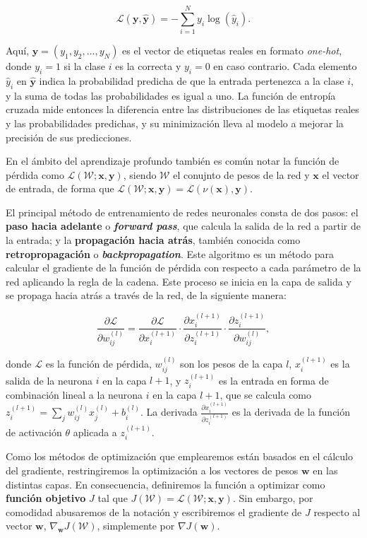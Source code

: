 \[
\mathcal{L}(\mathbf{y}, \mathbf{\hat{y}}) = -\sum_{i=1}^{N}y_{i} \log(\hat{y}_{i}
).
\]

Aquí, $\mathbf{y}= (y_{1}, y_{2}, \ldots, y_{N})$ es el vector de etiquetas
reales en formato \textit{one-hot}, donde $y_{i} = 1$ si la clase $i$ es la
correcta y $y_{i} = 0$ en caso contrario. Cada elemento $\hat{y}_{i}$ en $\mathbf{\hat{y}}$
indica la probabilidad predicha de que la entrada pertenezca a la clase $i$, y
la suma de todas las probabilidades es igual a uno. La función de entropía cruzada
mide entonces la diferencia entre las distribuciones de las etiquetas reales y las
probabilidades predichas, y su minimización lleva al modelo a mejorar la
precisión de sus predicciones.

En el ámbito del aprendizaje profundo también es común notar la función de
pérdida como $\mathcal{L}(\mathcal{W};\mathbf{x}, \mathbf{y})$, siendo $\mathcal{W}$
el conujnto de pesos de la red y $\mathbf{x}$ el vector de entrada, de forma que
$\mathcal{L}(\mathcal{W};\mathbf{x}, \mathbf{y}) = \mathcal{L}(\nu(\mathbf{x}), \mathbf{y}
)$.

El principal método de entrenamiento de redes neuronales consta de dos pasos: el
\textbf{paso hacia adelante} o \textbf{\textit{forward pass}}, que calcula la
salida de la red a partir de la entrada; y la \textbf{propagación hacia atrás}, también
conocida como \textbf{retropropagación} o \textbf{\textit{backpropagation}}.
Este algoritmo es un método para calcular el gradiente de la función de pérdida
con respecto a cada parámetro de la red aplicando la regla de la cadena. Este proceso
se inicia en la capa de salida y se propaga hacia atrás a través de la red, de
la siguiente manera:

\[
\frac{\partial \mathcal{L}}{\partial w_{ij}^{(l)}}= \frac{\partial \mathcal{L}}{\partial
	x_{i}^{(l+1)}}\cdot \frac{\partial x_{i}^{(l+1)}}{\partial z_{i}^{(l+1)}}\cdot
\frac{\partial z_{i}^{(l+1)}}{\partial w_{ij}^{(l)}},
\]

donde $\mathcal{L}$ es la función de pérdida, $w_{ij}^{(l)}$ son los pesos de la
capa $l$, $x_{i}^{(l+1)}$ es la salida de la neurona $i$ en la capa $l+1$, y
$z_{i}^{(l+1)}$ es la entrada en forma de combinación lineal a la neurona $i$ en
la capa $l+1$, que se calcula como $z_{i}^{(l+1)}= \sum_{j} w_{ij}^{(l)}x_{j}^{(l)}
+ b_{i}^{(l)}$. La derivada
$\frac{\partial x_{i}^{(l+1)}}{\partial z_{i}^{(l+1)}}$ es la derivada de la
función de activación $\theta$ aplicada a $z_{i}^{(l+1)}$.

Como los métodos de optimización que emplearemos están basados en el cálculo del
gradiente, restringiremos la optimización a los vectores de pesos $\mathbf{w}$ en
las distintas capas. En consecuencia, definiremos la función a optimizar como \textbf{función
	objetivo} $J$ tal que
$J(\mathcal{W}) = \mathcal{L}(\mathcal{W};\mathbf{x}, \mathbf{y})$. Sin embargo,
por comodidad abusaremos de la notación y escribiremos el gradiente de $J$
respecto al vector $\mathbf{w}$, $\nabla_{\mathbf{w}}J(\mathcal{W})$,
simplemente por $\nabla J(\mathbf{w})$.

